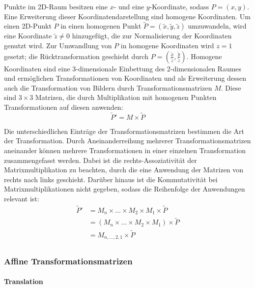 Punkte im 2D-Raum besitzen eine $x$- und eine $y$-Koordinate, sodass $P = (x, y)$. Eine Erweiterung dieser Koordinatendarstellung sind homogene Koordinaten. Um einen 2D-Punkt $P$ in einen homogenen Punkt $\widetilde{P} = (\widetilde{x}, \widetilde{y}, \widetilde{z})$ umzuwandeln, wird eine Koordinate $\widetilde{z} \neq 0$ hinzugefügt, die zur Normalisierung der Koordinaten genutzt wird. Zur Umwandlung von $P$ in homogene Koordinaten wird $z=1$ gesetzt; die Rücktransformation geschieht durch $P = (\frac{\widetilde{x}}{\widetilde{z}}, \frac{\widetilde{y}}{\widetilde{z}})$. Homogene Koordinaten sind eine 3-dimensionale Einbettung des 2-dimensionalen Raumes und ermöglichen Transformationen von Koordinaten und als Erweiterung dessen auch die Transformation von Bildern durch Transformationsmatrizen $M$. Diese sind $3 \times 3$ Matrizen, die durch Multiplikation mit homogenen Punkten Transformationen auf diesen anwenden:
\[ \widetilde{P}' = M \times \widetilde{P} \]

Die unterschiedlichen Einträge der Transformationsmatrizen bestimmen die Art der Transformation. Durch Aneinanderreihung mehrerer Transformationsmatrizen aneinander können mehrere Transformationen in einer einzelnen Transformation zusammengefasst werden. Dabei ist die rechts-Assoziativität der Matrixmultiplikation zu beachten, durch die eine Anwendung der Matrizen von rechts nach links geschieht. Darüber hinaus ist die Kommutativität bei Matrixmultiplikationen nicht gegeben, sodass die Reihenfolge der Anwendungen relevant ist:
\begin{align*}
    \widetilde{P}' & = M_n \times \dots \times M_2 \times M_1 \times \widetilde{P}   \\
                   & = (M_n \times \dots \times M_2 \times M_1) \times \widetilde{P} \\
                   & = M_{n, \dots, 2, 1} \times \widetilde{P}                       \\
\end{align*}

\subsubsection{Affine Transformationsmatrizen}
\label{sec:affine_transformations_matrizen}

\paragraph{Translation}
\label{par:translation}

